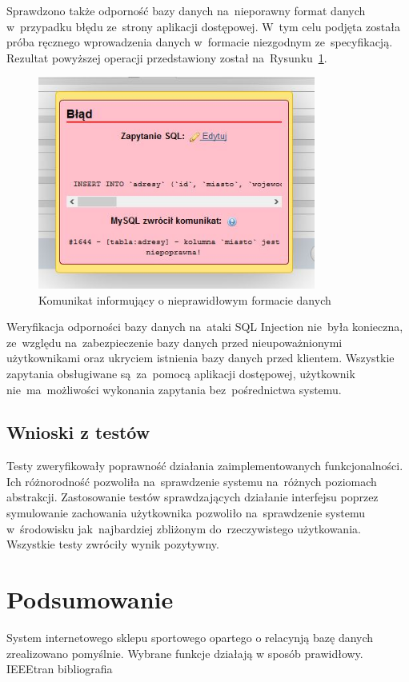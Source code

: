 \documentclass[a4paper, 12pt]{article}
\begin{document}
Sprawdzono także odporność bazy danych na~nieporawny format danych w~przypadku błędu ze~strony aplikacji dostępowej. W~tym celu podjęta została próba ręcznego wprowadzenia danych w~formacie niezgodnym ze~specyfikacją. Rezultat powyższej operacji przedstawiony został na~Rysunku~\ref{fig:testTriggera}.
\begin{figure}[H]
	\centering
	\includegraphics[height=7cm]{Screeny/TriggerDziala.JPG}
	\caption[Rezultat testu triggera]{Komunikat informujący o nieprawidłowym formacie danych}
	\label{fig:testTriggera}
\end{figure}
Weryfikacja odporności bazy danych na~ataki SQL Injection nie~była konieczna, ze~względu na~zabezpieczenie bazy danych przed nieupoważnionymi użytkownikami oraz ukryciem istnienia bazy danych przed klientem. Wszystkie zapytania obsługiwane są~za~pomocą aplikacji dostępowej, użytkownik nie~ma~możliwości wykonania zapytania bez~pośrednictwa systemu.
\subsection{Wnioski z testów}
Testy zweryfikowały poprawność działania zaimplementowanych funkcjonalności. Ich różnorodność pozwoliła na~sprawdzenie systemu na~różnych poziomach abstrakcji. Zastosowanie testów sprawdzających działanie interfejsu poprzez symulowanie zachowania użytkownika pozwoliło na~sprawdzenie systemu w~środowisku jak~najbardziej zbliżonym do~rzeczywistego użytkowania. Wszystkie testy zwróciły wynik pozytywny.
\section{Podsumowanie}
System internetowego sklepu sportowego opartego o relacynją bazę danych zrealizowano pomyślnie. Wybrane funkcje działają w sposób prawidłowy.
\cleardoublepage
 {IEEEtran}
 {bibliografia}
\nocite {*}
\end{document}
